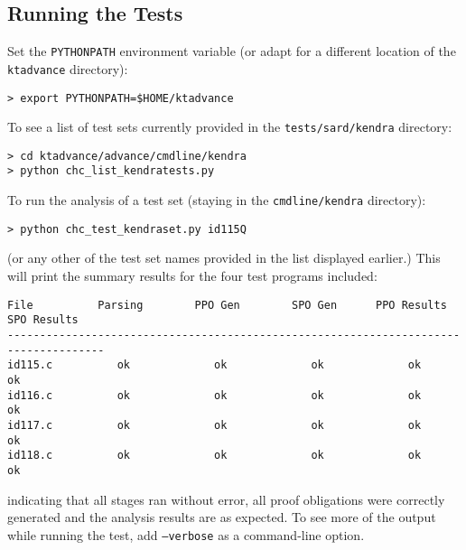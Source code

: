 \documentclass[11pt]{article}
\begin{document}
\subsection{Running the Tests}
\label{sec:runkendra}

Set the {\tt PYTHONPATH} environment variable (or adapt for a different location
of the {\tt ktadvance} directory):
\begin{verbatim}
> export PYTHONPATH=$HOME/ktadvance
\end{verbatim}
To see a list of test sets currently provided in the {\tt tests/sard/kendra}
directory:
\begin{verbatim}
> cd ktadvance/advance/cmdline/kendra
> python chc_list_kendratests.py
\end{verbatim}
To run the analysis of a test set (staying in the {\tt cmdline/kendra} directory):
\begin{verbatim}
> python chc_test_kendraset.py id115Q
\end{verbatim}
(or any other of the test set names provided in the list displayed earlier.)
This will print the summary results for the four test programs included:
\begin{small}
\begin{verbatim}
File          Parsing        PPO Gen        SPO Gen      PPO Results    SPO Results  
-------------------------------------------------------------------------------------
id115.c          ok             ok             ok             ok             ok      
id116.c          ok             ok             ok             ok             ok      
id117.c          ok             ok             ok             ok             ok      
id118.c          ok             ok             ok             ok             ok      
\end{verbatim}
\end{small}

indicating that all stages ran without error, all proof obligations were correctly
generated and the analysis results are as expected. 
To see more of the output while running the test, add {\tt --verbose} as a command-line option.
\end{document}
